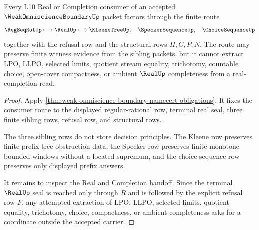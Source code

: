 \begin{theorem}
\label{thm:weak-omniscience-boundary-real-completion-nonescape}
Every L10 Real or Completion consumer of an accepted $\WeakOmniscienceBoundaryUp$ packet factors through the finite route
$$
\RegSeqRatUp\longmapsto \RealUp\longmapsto
\KleeneTreeUp,\quad \SpeckerSequenceUp,\quad \ChoiceSequenceUp
$$
together with the refusal row and the structural rows $H,C,P,N$. The route may preserve finite witness evidence from the sibling packets, but it cannot extract LPO, LLPO, selected limits, quotient stream equality, trichotomy, countable choice, open-cover compactness, or ambient $\RealUp$ completeness from a real-completion read.
\end{theorem}
\begin{proof}
Apply \autoref{thm:weak-omniscience-boundary-namecert-obligations}. It fixes the consumer route to the displayed regular-rational row, terminal real seal, three finite sibling rows, refusal row, and structural rows.

The three sibling rows do not store decision principles. The Kleene row preserves finite prefix-tree obstruction data, the Specker row preserves finite monotone bounded windows without a located supremum, and the choice-sequence row preserves only displayed prefix answers.

It remains to inspect the Real and Completion handoff. Since the terminal $\RealUp$ seal is reached only through $R$ and is followed by the explicit refusal row $F$, any attempted extraction of LPO, LLPO, selected limits, quotient equality, trichotomy, choice, compactness, or ambient completeness asks for a coordinate outside the accepted carrier.
\end{proof}



